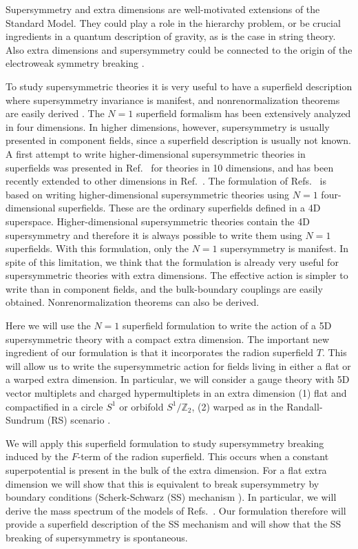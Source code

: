\documentclass[a4paper,12pt]{article}
\newcommand{\Zparity}{\ensuremath{\mathbb{Z}_2}}
\begin{document}
Supersymmetry and extra dimensions are well-motivated extensions
of the Standard Model.
They could play a role in
 the hierarchy problem, or be crucial ingredients 
in a quantum description of gravity, as is
the case in  string theory. 
Also extra dimensions and supersymmetry could be connected to the origin
of the  electroweak symmetry breaking \cite{ewsb}.



To study  supersymmetric theories it is very useful
to have a  superfield description
where supersymmetry invariance is manifest,
and nonrenormalization theorems are easily derived \cite{wb}.
The $N=1$ superfield formalism has been extensively analyzed in 
four dimensions.
In  higher dimensions, however,
supersymmetry is usually presented in component fields,
since a superfield description is usually not known.
A first attempt to write  higher-dimensional
supersymmetric theories in superfields
was presented in Ref.~\cite{mss} for  theories  in 10 dimensions,
and  
has  been  recently extended to other dimensions in Ref.~\cite{agw}.
The formulation of Refs.~\cite{mss,agw}   is based  on writing
higher-dimensional supersymmetric theories using  $N=1$ 
four-dimensional superfields.
These are the ordinary superfields defined in a  4D superspace. 
Higher-dimensional supersymmetric theories contain the 4D supersymmetry
and therefore it is always possible to write them 
using $N=1$ superfields.
With this formulation, only the $N=1$ supersymmetry is manifest.
In spite 
of this limitation, we think that the formulation is
already very useful for supersymmetric theories with extra dimensions.
The effective action is  simpler to write than  in component fields,
and the bulk-boundary couplings are easily obtained.
Nonrenormalization theorems can also be derived.


Here we will use the $N=1$ superfield formulation to
write the action of a 5D supersymmetric theory with 
a compact extra dimension.
The important new ingredient  of our formulation is that 
it incorporates the radion superfield $T$.
This will allow us   to write the supersymmetric action for fields
living in either  a flat or  a warped extra dimension.
In particular, we will consider a gauge theory with 
 5D vector multiplets and charged hypermultiplets in an
extra dimension 
(1) flat and  compactified 
in a circle $S^1$ or orbifold $S^1/\Zparity$, 
(2) warped as in the Randall-Sundrum (RS) scenario \cite{rs}.

We will apply this superfield formulation to
study supersymmetry  breaking induced by the  $F$-term of the 
radion superfield. 
This occurs when a constant superpotential
is present in the bulk of the extra dimension.
For a flat extra dimension
we will show that 
this is equivalent to break  supersymmetry by boundary conditions
(Scherk-Schwarz (SS) mechanism \cite{ss}).
In particular, we will derive the  mass spectrum of the models of 
Refs.~\cite{pq,bhn}.
Our formulation therefore will provide a superfield
description of 
the SS mechanism and will show that 
the SS  breaking of supersymmetry is spontaneous.
\end{document}
